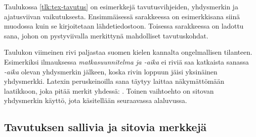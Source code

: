 
Taulukossa \ref{tlk:tex-tavutus} on esimerkkejä tavutusvihjeiden,
yhdysmerkin ja ajatusviivan vaikutuksesta. Ensimmäisessä sarakkeessa on
esimerkkisana siinä muodossa kuin se kirjoitetaan lähdetiedostoon.
Toisessa sarakkeessa on ladottu sana, johon on pystyviivalla merkittynä
mahdolliset tavutuskohdat.

Taulukon viimeinen rivi paljastaa suomen kielen kannalta ongelmallisen
tilanteen. Esimerkiksi ilmauksessa \emph{matkasuunnitelma ja
  \mbox{-aika}} ei riviä saa katkaista sanassa \emph{\mbox{-aika}}
olevan yhdysmerkin jälkeen, koska rivin loppuun jäisi yksinäinen
yhdysmerkki. Latexin peruskeinoilla sana täytyy laittaa näkymättömään
laatikkoon, joka pitää merkit yhdessä: .
Toinen vaihtoehto on sitovan yhdysmerkin käyttö, jota käsitellään
seuraavassa alaluvussa.

\subsection{Tavutuksen sallivia ja sitovia merkkejä}


